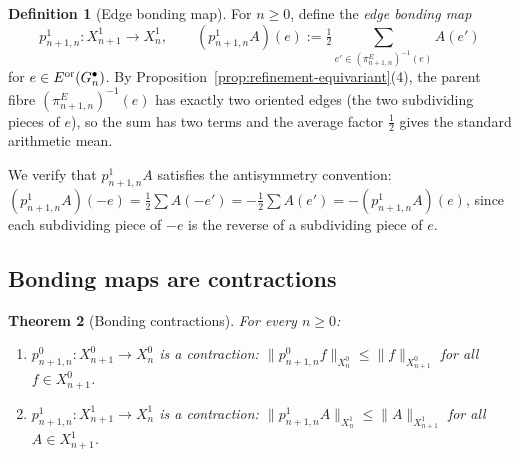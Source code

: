 \documentclass[11pt, a4paper]{amsart}
\newtheorem{theorem}{Theorem}[section]
\theoremstyle{definition}
\newtheorem{definition}[theorem]{Definition}
\begin{document}
\begin{definition}[Edge bonding map]
\label{def:p1}
For $n \geq 0$, define the \emph{edge bonding map}
\[
  p_{n+1, n}^1 \colon X_{n+1}^1 \to X_n^1, \qquad
    (p_{n+1, n}^1 A)(e) := \tfrac{1}{2} \sum_{e' \in (\pi_{n+1, n}^E)^{-1}(e)}
    A(e')
\]
for $e \in E^{\rm or}(G_n^\bullet)$. By
Proposition~\ref{prop:refinement-equivariant}(4), the parent fibre
$(\pi_{n+1, n}^E)^{-1}(e)$ has exactly two oriented edges (the two
subdividing pieces of $e$), so the sum has two terms and the average
factor $\tfrac{1}{2}$ gives the standard arithmetic mean.

We verify that $p_{n+1, n}^1 A$ satisfies the antisymmetry
convention: $(p_{n+1, n}^1 A)(-e) = \tfrac{1}{2} \sum A(-e') =
-\tfrac{1}{2} \sum A(e') = -(p_{n+1, n}^1 A)(e)$, since each
subdividing piece of $-e$ is the reverse of a subdividing piece of
$e$.
\end{definition}

\subsection{Bonding maps are contractions}

\begin{theorem}[Bonding contractions]
\label{thm:bonding}
For every $n \geq 0$:
\begin{enumerate}
\item $p_{n+1, n}^0 \colon X_{n+1}^0 \to X_n^0$ is a contraction:
  $\|p_{n+1, n}^0 f\|_{X_n^0} \leq \|f\|_{X_{n+1}^0}$ for all
  $f \in X_{n+1}^0$.
\item $p_{n+1, n}^1 \colon X_{n+1}^1 \to X_n^1$ is a contraction:
  $\|p_{n+1, n}^1 A\|_{X_n^1} \leq \|A\|_{X_{n+1}^1}$ for all
  $A \in X_{n+1}^1$.
\end{enumerate}
\end{theorem}
\end{document}
